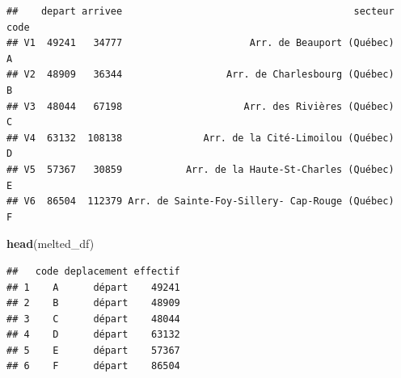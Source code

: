 \documentclass[
  11pt,
  french,
]{book}
\makeatletter
\newenvironment{Shaded}{\begin{snugshade}}{\end{snugshade}}
\newcommand{\CommentTok}[1]{\textcolor[rgb]{0.56,0.35,0.01}{\textit{#1}}}
\newcommand{\DataTypeTok}[1]{\textcolor[rgb]{0.13,0.29,0.53}{#1}}
\newcommand{\DecValTok}[1]{\textcolor[rgb]{0.00,0.00,0.81}{#1}}
\newcommand{\FloatTok}[1]{\textcolor[rgb]{0.00,0.00,0.81}{#1}}
\newcommand{\KeywordTok}[1]{\textcolor[rgb]{0.13,0.29,0.53}{\textbf{#1}}}
\newcommand{\NormalTok}[1]{#1}
\newcommand{\OperatorTok}[1]{\textcolor[rgb]{0.81,0.36,0.00}{\textbf{#1}}}
\newcommand{\StringTok}[1]{\textcolor[rgb]{0.31,0.60,0.02}{#1}}
\newenvironment{kframe}{%
\medskip{}
\setlength{\fboxsep}{.8em}
 \def\at@end@of@kframe{}%
 \ifinner\ifhmode%
  \def\at@end@of@kframe{\end{minipage}}%
  \begin{minipage}{\columnwidth}%
 \fi\fi%
 \def\FrameCommand##1{\hskip\@totalleftmargin \hskip-\fboxsep
 \colorbox{shadecolor}{##1}\hskip-\fboxsep
     \hskip-\linewidth \hskip-\@totalleftmargin \hskip\columnwidth}%
 \MakeFramed {\advance\hsize-\width
   \@totalleftmargin\z@ \linewidth\hsize
   \@setminipage}}%
 {\par\unskip\endMakeFramed%
 \at@end@of@kframe}
\renewenvironment{Shaded}{\begin{kframe}}{\end{kframe}}
\makeatother
\begin{document}
\begin{verbatim}
##    depart arrivee                                        secteur code
## V1  49241   34777                      Arr. de Beauport (Québec)    A
## V2  48909   36344                  Arr. de Charlesbourg (Québec)    B
## V3  48044   67198                     Arr. des Rivières (Québec)    C
## V4  63132  108138              Arr. de la Cité-Limoilou (Québec)    D
## V5  57367   30859           Arr. de la Haute-St-Charles (Québec)    E
## V6  86504  112379 Arr. de Sainte-Foy-Sillery- Cap-Rouge (Québec)    F
\end{verbatim}

\begin{Shaded}
\begin{Highlighting}[]
\KeywordTok{head}\NormalTok{(melted_df)}
\end{Highlighting}
\end{Shaded}

\begin{verbatim}
##   code deplacement effectif
## 1    A      départ    49241
## 2    B      départ    48909
## 3    C      départ    48044
## 4    D      départ    63132
## 5    E      départ    57367
## 6    F      départ    86504
\end{verbatim}

\begin{Shaded}
\end{Shaded}
\end{document}
